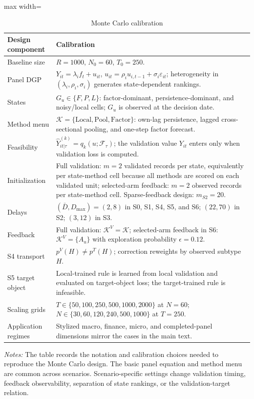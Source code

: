 \documentclass[a4paper,12pt]{article}
\newcommand{\Kcal}{\mathcal{K}}
\newcommand{\Fcal}{\mathcal{F}}
\newcommand{\1}{\mathbf{1}}
\newcommand{\ExhibitNote}[1]{\begin{minipage}{0.94\textwidth}\footnotesize\emph{Notes:} #1\end{minipage}}
\begin{document}
\begin{table}[H]
\centering
\caption{Monte Carlo calibration}
\label{tab:ia_mc_calibration}
\small
\begin{adjustbox}{max width=\textwidth}
\begin{tabular}{@{}p{}p{}@{}}
\toprule
Design component & Calibration \\
\midrule
Baseline size & $R=1000$, $N_0=60$, $T_0=250$. \\
Panel DGP & $Y_{it}=\lambda_i f_t+u_{it}$, $u_{it}=\rho_i u_{i,t-1}+\sigma_i\varepsilon_{it}$; heterogeneity in $(\lambda_i,\rho_i,\sigma_i)$ generates state-dependent rankings. \\
States & $G_u\in\{F,P,L\}$: factor-dominant, persistence-dominant, and noisy/local cells; $G_u$ is observed at the decision date. \\
Method menu & $\Kcal=\{\text{Local},\text{Pool},\text{Factor}\}$: own-lag persistence, lagged cross-sectional pooling, and one-step factor forecast. \\
Feasibility & $\widehat Y^{(k)}_{it|\tau}=q_k(u;\Fcal_\tau)$; the validation value $Y_{it}$ enters only when validation loss is computed. \\
Initialization & Full validation: $m=2$ validated records per state, equivalently per state-method cell because all methods are scored on each validated unit; selected-arm feedback: $m=2$ observed records per state-method cell. Sparse-feedback design: $m_{S2}=20$. \\
Delays & $(\bar D,D_{\max})=(2,8)$ in S0, S1, S4, S5, and S6; $(22,70)$ in S2; $(3,12)$ in S3. \\
Feedback & Full validation: $\Kcal^V=\Kcal$; selected-arm feedback in S6: $\Kcal^V=\{A_u\}$ with exploration probability $\epsilon=0.12$. \\
S4 transport & $p^V(H)\ne p^T(H)$; correction reweights by observed subtype $H$. \\
S5 target object & Local-trained rule is learned from local validation and evaluated on target-object loss; the target-trained rule is infeasible. \\
Scaling grids & $T\in\{50,100,250,500,1000,2000\}$ at $N=60$; $N\in\{30,60,120,240,500,1000\}$ at $T=250$. \\
Application regimes & Stylized macro, finance, micro, and completed-panel dimensions mirror the cases in the main text. \\
\bottomrule
\end{tabular}
\end{adjustbox}
\par\medskip
\ExhibitNote{The table records the notation and calibration choices needed to reproduce the Monte Carlo design. The basic panel equation and method menu are common across scenarios. Scenario-specific settings change validation timing, feedback observability, separation of state rankings, or the validation-target relation.}
\end{table}
\end{document}
